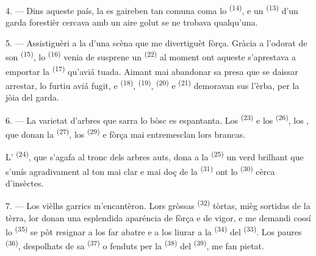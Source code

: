 4. --- Dins aqueste país, la  es gaireben tan comuna coma lo
 \textsuperscript{(14)}, e un 
\textsuperscript{(13)} d'un garda forestièr cercava amb un aire golut se ne
trobava qualqu'una.

\VUsaut{3.0mm}
\VUsaut{3.0mm}

5. --- Assistiguèri a la  d'una scèna que me divertiguèt fòrça.
Gràcia a l'odorat de son  \textsuperscript{(15)}, lo
 \textsuperscript{(16)} venia de susprene un
 \textsuperscript{(22)} al moment ont aqueste s'aprestava a
emportar la  \textsuperscript{(17)} qu'aviá tuada. Aimant mai
abandonar sa presa que se daissar arrestar, lo furtiu aviá fugit, e
 \textsuperscript{(18)},  \textsuperscript{(19)},
 \textsuperscript{(20)} e 
\textsuperscript{(21)} demoravan sus l'èrba, per la jòia del garda.

6. --- La varietat d'arbres que sarra lo bòsc es espantanta. Los 
\textsuperscript{(23)} e los  \textsuperscript{(26)}, los
, que donan la  \textsuperscript{(27)}, los
 \textsuperscript{(29)} e fòrça mai entremesclan lors brancas.

L' \textsuperscript{(24)}, que s'agafa al tronc dels arbres auts,
dona a la  \textsuperscript{(25)} un verd brilhant que s'unís
agradivament al ton mai clar e mai doç de la 
\textsuperscript{(31)} ont lo  \textsuperscript{(30)} cèrca
d'insèctes.

\VUsaut{3.0mm}
\VUsaut{3.0mm}

7. --- Los vièlhs garrics m'encantèron. Lors gròssas 
\textsuperscript{(32)} tòrtas, mièg sortidas de la tèrra, lor donan una esplendida
aparéncia de fòrça e de vigor, e me demandi cossí lo 
\textsuperscript{(35)} se pòt resignar a los far abatre e a los liurar a la
 \textsuperscript{(34)} del 
\textsuperscript{(33)}. Los paures  \textsuperscript{(36)},
despolhats de sa  \textsuperscript{(37)} o fenduts per la
 \textsuperscript{(38)} del 
\textsuperscript{(39)}, me fan pietat.

